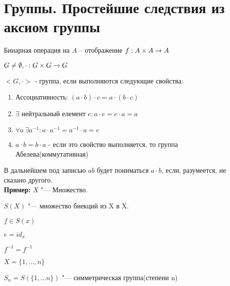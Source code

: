 \section{Группы. Простейшие следствия из аксиом группы}
\begin{Def}
	Бинарная операция на $A$ -- отображение $f : A \times A \rightarrow A$
\end{Def}
$G \neq \emptyset, \cdot : G \times G \rightarrow G$

$<G, \cdot > $ - группа, если выполняются следующие свойства:
\begin{enumerate}
	\item Ассоциативность: $(a \cdot b) \cdot c = a \cdot (b \cdot c)$		
	\item $\exists$ нейтральный елемент $e : a \cdot e = e \cdot a = a$
	\item $\forall a \: \exists a^{-1} : a \cdot a^{-1} = a^{-1} \cdot a = e$		
	\item $a \cdot b = b \cdot a$ - если это свойство выполняется, то группа Абелева(коммутативная) 
\end{enumerate}

В дальнейшем под записью $ab$ будет пониматься $a \cdot b$, если, разумеется, не сказано другого.     \\

{\bf Пример:} 
$X$ "--- Множество.

$S(X)$ "--- множество биекций из X в X.

$f \in S(x)$

$e = id_x$

$f^{-1} =f^{-1}$

$X = \{1, \ldots, n\}$

$S_n = S(\{1, \ldots n\})$ "--- симметрическая группа(степени n)
	
